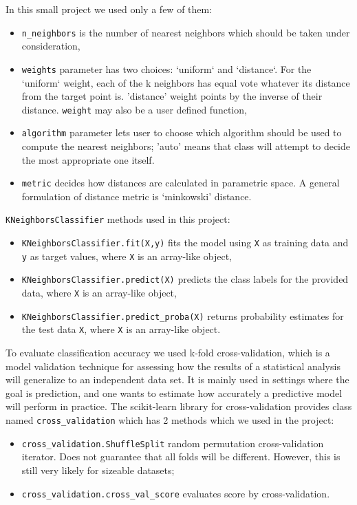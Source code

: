 \documentclass[a4paper,10pt]{article}
\begin{document}
In this small project we used only a few of them:
\begin{itemize}
    \item \texttt{n\_neighbors} is the number of nearest neighbors which should be taken under consideration,
    \item \texttt{weights} parameter has two choices: ‘uniform‘ and ‘distance‘. For the ‘uniform‘ weight, each of the k neighbors has equal vote whatever its distance from the target point is. 'distance' weight points by the inverse of their distance. \texttt{weight} may also be a user defined function,
    \item \texttt{algorithm} parameter lets user to choose which algorithm should be used to compute the nearest neighbors; 'auto' means that class will attempt to decide the most appropriate one itself.
    \item \texttt{metric} decides how distances are calculated in parametric space. A general formulation of distance metric is ‘minkowski’ distance.
\end{itemize}


\texttt{KNeighborsClassifier} methods used in this project:
\begin{itemize}
    \item \texttt{KNeighborsClassifier.fit(X,y)} fits the model using \texttt{X} as training data and \texttt{y} as target values, where \texttt{X} is an array-like object,
    \item \texttt{KNeighborsClassifier.predict(X)} predicts the class labels for the provided data, where \texttt{X} is an array-like object,
    \item \texttt{KNeighborsClassifier.predict\_proba(X)} returns probability estimates for the test data \texttt{X}, where \texttt{X} is an array-like object.
\end{itemize}    
    
To evaluate classification accuracy we used k-fold cross-validation, which is a model validation technique for assessing how the results of a statistical analysis will generalize
to an independent data set. It is mainly used in settings where the goal is prediction, and one wants to estimate how accurately a predictive model will perform in practice. 
The scikit-learn library for cross-validation provides class named \texttt{cross\_validation} which has 2 methods which we used in the project:
\begin{itemize}
  \item \texttt{cross\_validation.ShuffleSplit} random permutation cross-validation iterator. Does not guarantee that all folds will be different. However, this is still very likely for sizeable datasets;
  \item \texttt{cross\_validation.cross\_val\_score} evaluates score by cross-validation.
\end{itemize}
\end{document}
